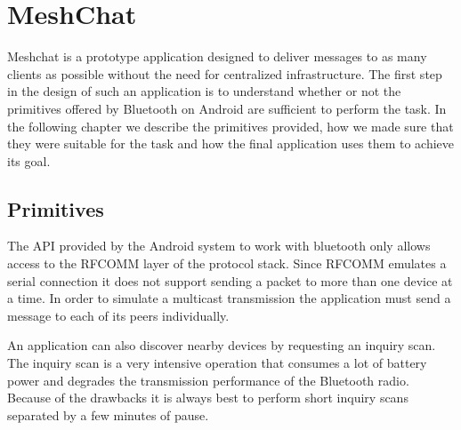 \chapter{MeshChat}
Meshchat is a prototype application designed to deliver messages to as many clients as possible without the need for centralized infrastructure.
The first step in the design of such an application is to understand whether or not the primitives offered by Bluetooth on Android are sufficient to perform the task.
In the following chapter we describe the primitives provided, how we made sure that they were suitable for the task and how the final application uses them to achieve its goal.
\section{Primitives}
The API provided by the Android system to work with bluetooth only allows access to the RFCOMM layer of the protocol stack.
Since RFCOMM emulates a serial connection it does not support sending a packet to more than one device at a time.
In order to simulate a multicast transmission the application must send a message to each of its peers individually.

An application can also discover nearby devices by requesting an inquiry scan.
The inquiry scan is a very intensive operation that consumes a lot of battery power and degrades the transmission performance of the Bluetooth radio.
Because of the drawbacks it is always best to perform short inquiry scans separated by a few minutes of pause.


